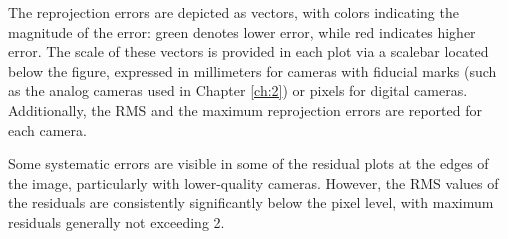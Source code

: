 The reprojection errors are depicted as vectors, with colors indicating the magnitude of the error: green denotes lower error, while red indicates higher error.
The scale of these vectors is provided in each plot via a scalebar located below the figure, expressed in millimeters for cameras with fiducial marks (such as the analog cameras used in Chapter \ref{ch:2}) or pixels for digital cameras. 
Additionally, the RMS and the maximum reprojection errors are reported for each camera.

Some systematic errors are visible in some of the residual plots at the edges of the image, particularly with lower-quality cameras. 
However, the RMS values of the residuals are consistently significantly below the pixel level, with maximum residuals generally not exceeding \SI{2}{\pixel}.

\begin{figure}[hb]
  \centering
   \qquad
   \\ \vspace{2mm}
\end{figure}
